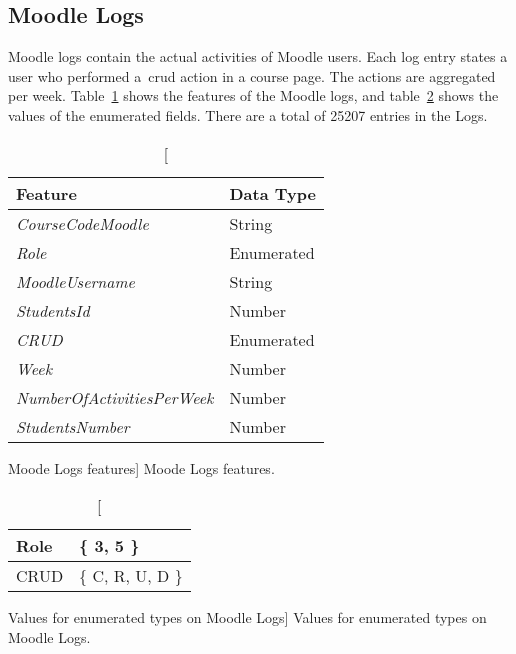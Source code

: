 \subsection{Moodle Logs}
\label{sec:logs}

Moodle logs contain the actual activities of Moodle users. Each log entry
states a user who performed a~\gls{crud} action in a course page. The actions
are aggregated per week. Table~\ref{tab:moodle_logs_features} shows the
features of the Moodle logs, and table~\ref{tab:moodle_logs_enum} shows the
values of the enumerated fields. There are a total of 25207 entries in the
Logs.

\begin{table}[h!]
    \centering

    \begin{tabular}{l l}
        Feature                            & Data Type  \\ \hline
        \textit{CourseCodeMoodle}          & String     \\
        \textit{Role}                      & Enumerated \\
        \textit{MoodleUsername}            & String     \\
        \textit{StudentsId}                & Number     \\
        \textit{CRUD}                      & Enumerated \\
        \textit{Week}                      & Number     \\
        \textit{NumberOfActivitiesPerWeek} & Number     \\
        \textit{StudentsNumber}            & Number     \\
    \end{tabular}

    \caption
        [Moode Logs features]
        {Moode Logs features.}

    \label{tab:moodle_logs_features}
\end{table}

\begin{table}[h!]
    \centering

    \begin{tabular}{| l | l |}
        \hline
        Role & \{ 3, 5 \} \\ \hline
        CRUD & \{ C, R, U, D \}  \\ \hline
    \end{tabular}

    \caption
        [Values for enumerated types on Moodle Logs]
        {Values for enumerated types on Moodle Logs.}

    \label{tab:moodle_logs_enum}
\end{table}

